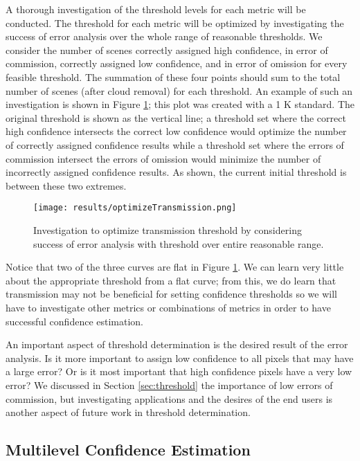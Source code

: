 \documentclass{book}
\begin{document}
A thorough investigation of the threshold levels for each metric will be conducted.  The threshold for each metric will be optimized by investigating the success of error analysis over the whole range of reasonable thresholds.  We consider the number of scenes correctly assigned high confidence, in error of commission, correctly assigned low confidence, and in error of omission for every feasible threshold.  The summation of these four points should sum to the total number of scenes (after cloud removal) for each threshold.  An example of such an investigation is shown in Figure \ref{fig:optimizeTransmission}; this plot was created with a 1 K standard.  The original threshold is shown as the vertical line; a threshold set where the correct high confidence intersects the correct low confidence would optimize the number of correctly assigned confidence results while a threshold set where the errors of commission intersect the errors of omission would minimize the number of incorrectly assigned confidence results.  As shown, the current initial threshold is between these two extremes.

\begin{figure}[H]
\centering
\texttt{[image: results/optimizeTransmission.png]}
\caption{Investigation to optimize transmission threshold by considering success of error analysis with threshold over entire reasonable range.}
\label{fig:optimizeTransmission}
\end{figure}

Notice that two of the three curves are flat in Figure \ref{fig:optimizeTransmission}.  We can learn very little about the appropriate threshold from a flat curve; from this, we do learn that transmission may not be beneficial for setting confidence thresholds so we will have to investigate other metrics or combinations of metrics in order to have successful confidence estimation.

An important aspect of threshold determination is the desired result of the error analysis.  Is it more important to assign low confidence to all pixels that may have a large error?  Or is it most important that high confidence pixels have a very low error?  We discussed in Section \ref{sec:threshold} the importance of low errors of commission, but investigating applications and the desires of the end users is another aspect of future work in threshold determination.

\subsection{Multilevel Confidence Estimation}
\end{document}
